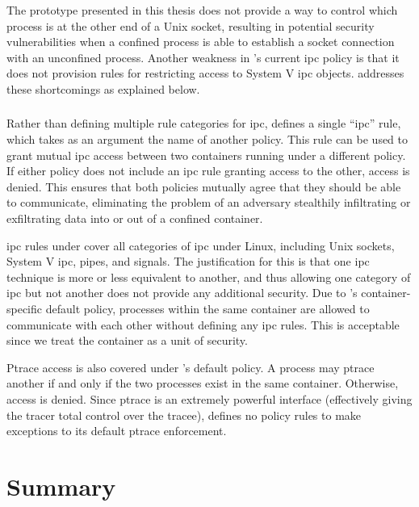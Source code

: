 The \bpfbox{} prototype presented in this thesis does not provide a way to control which
process is at the other end of a Unix socket, resulting in potential security
vulnerabilities when a confined process is able to establish a socket connection with an
unconfined process. Another weakness in \bpfbox{}'s current \gls{ipc} policy is that it
does not provision rules for restricting access to System V \gls{ipc} objects.
\bpfcontain{} addresses these shortcomings as explained below.

\subsubsection{\bpfcontain{}}

Rather than defining multiple rule categories for \gls{ipc}, \bpfcontain{} defines
a single \enquote{\gls{ipc}} rule, which takes as an argument the name of another
\bpfcontain{} policy. This rule can be used to grant mutual \gls{ipc} access between two
containers running under a different policy. If either policy does not include an
\gls{ipc} rule granting access to the other, access is denied. This ensures that both
policies mutually agree that they should be able to communicate, eliminating the problem
of an adversary stealthily infiltrating or exfiltrating data into or out of a confined
container.

\gls{ipc} rules under \bpfcontain{} cover all categories of \gls{ipc} under Linux,
including Unix sockets, System V \gls{ipc}, pipes, and signals. The justification for this
is that one \gls{ipc} technique is more or less equivalent to another, and thus allowing
one category of \gls{ipc} but not another does not provide any additional security. Due to
\bpfcontain{}'s container-specific default policy, processes within the same container are
allowed to communicate with each other without defining any \gls{ipc} rules. This is
acceptable since we treat the container as a unit of security.

Ptrace access is also covered under \bpfcontain{}'s default policy. A process may ptrace
another if and only if the two processes exist in the same container. Otherwise, access is
denied. Since ptrace is an extremely powerful interface (effectively giving the tracer
total control over the tracee), \bpfcontain{} defines no policy rules to make exceptions
to its default ptrace enforcement.


\section{Summary}%
\label{s:eval-summary}

